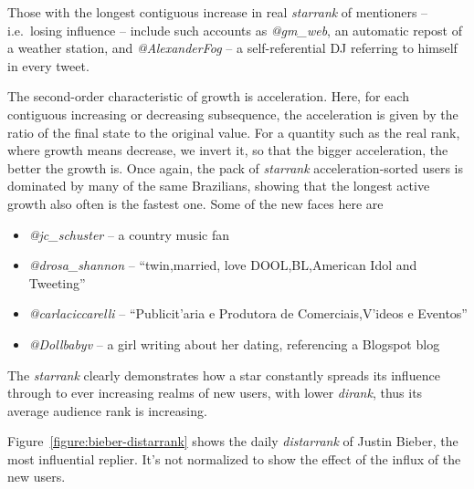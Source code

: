 \documentclass[10pt,oneside]{memoir}
\begin{document}
\begin{Spacing}{2}
Those with the longest contiguous increase in real {\itshape starrank} of mentioners -- i.e.\ losing influence -- include such accounts as \emph{@gm\_web}, an automatic repost of a weather station, and {\itshape @AlexanderFog} -- a self-referential DJ referring to himself in every tweet.


The second-order characteristic of growth is acceleration.  Here, for each contiguous increasing or decreasing subsequence, the acceleration is given by the ratio of the final state to the original value.  For a quantity such as the real rank, where growth means decrease, we invert it, so that the bigger acceleration, the better the growth is.  Once again, the pack of {\itshape starrank} acceleration-sorted users is dominated by many of the same Brazilians, showing that the longest active growth also often is the fastest one.  Some of the new faces here are


\begin{itemize}


\item \emph{@jc\_schuster} -- a country music fan

\item \emph{@drosa\_shannon} -- ``twin,married, love DOOL,BL,American Idol and Tweeting''

\item {\itshape @carlaciccarelli} -- ``Publicit'{a}ria e Produtora de Comerciais,V'{i}deos e Eventos''

\item {\itshape @Dollbabyv} -- a girl writing about her dating, referencing a Blogspot blog
\end{itemize}

The {\itshape starrank} clearly demonstrates how a star constantly spreads its influence through to ever increasing realms of new users, with lower {\itshape dirank}, thus its average audience rank is increasing.  


Figure~\ref{figure:bieber-distarrank} shows the daily {\itshape distarrank} of Justin Bieber, the most influential replier.  It's not normalized to show the effect of the influx of the new users.





\end{Spacing}
\end{document}
